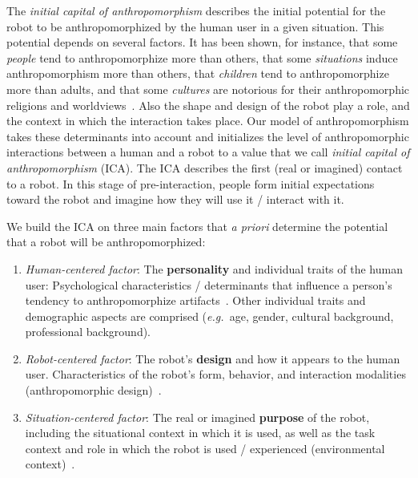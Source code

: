\documentclass{frontiersSCNS} %
\newcommand{\eg}{{\textit{e.g.~}}}
\begin{document}
The \emph{initial capital of anthropomorphism} describes the initial potential
for the robot to be anthropomorphized by the human user in a given situation.
This potential depends on several factors. It has been shown, for instance, that
some \textit{people} tend to anthropomorphize more than others, that some
\textit{situations} induce anthropomorphism more than others, that
\textit{children} tend to anthropomorphize more than adults, and that some
\textit{cultures} are notorious for their anthropomorphic religions and
worldviews~\cite{epley_when_2008}. Also the shape and design of the robot play a
role, and the context in which the interaction takes place. Our model of
anthropomorphism takes these determinants into account and initializes the level
of anthropomorphic interactions between a human and a robot to a value that we
call \emph{initial capital of anthropomorphism} (ICA). The ICA describes the
first (real or imagined) contact to a robot. In this stage of pre-interaction,
people form initial expectations toward the robot and imagine how they will use
it / interact with it.

We build the ICA on three main factors that \emph{a priori} determine the
potential that a robot will be anthropomorphized:

\begin{enumerate}

    \item \emph{Human-centered factor}: The \textbf{personality} and individual
        traits of the human user: Psychological characteristics / determinants
        that influence a person's tendency to anthropomorphize
        artifacts~\cite{epley_seeing_2007}. Other individual traits and
        demographic aspects are comprised (\eg age, gender, cultural background,
        professional background).

    \item \emph{Robot-centered factor}: The robot's \textbf{design} and how it
        appears to the human user. Characteristics of the robot's form,
        behavior, and interaction modalities (anthropomorphic
        design)~\cite{fong_survey_2003}.

    \item \emph{Situation-centered factor}: The real or imagined
        \textbf{purpose} of the robot, including the situational context in
        which it is used, as well as the task context and role in which the
        robot is used / experienced (environmental
        context)~\cite{joosse_what_2013}.

\end{enumerate}	
\end{document}

